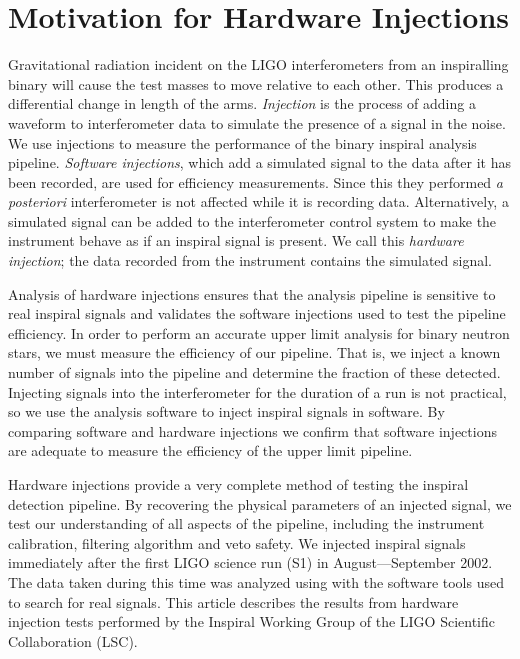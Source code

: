 \section{Motivation for Hardware Injections}
\label{s:intro}
Gravitational radiation incident on the LIGO interferometers from an
inspiralling binary will cause the test masses to move relative to each other.
This produces a differential change in length of the arms\cite{saulson}.
\emph{Injection} is the process of adding a waveform to interferometer data to
simulate the presence of a signal in the noise. We use injections to measure
the performance of the binary inspiral analysis pipeline\cite{abbott2003b}.
\emph{Software injections}, which add a simulated signal to the data after it
has been recorded, are used for efficiency measurements. Since this they
performed \emph{a posteriori} interferometer is not affected while it is
recording data.  Alternatively, a simulated signal can be added to the
interferometer control system to make the instrument behave as if an inspiral
signal is present. We call this \emph{hardware injection}; the data recorded
from the instrument contains the simulated signal.

Analysis of hardware injections ensures that the analysis pipeline is
sensitive to real inspiral signals and validates the software injections used
to test the pipeline efficiency.  In order to perform an accurate upper limit
analysis for binary neutron stars, we must measure the efficiency of our
pipeline\cite{abbott2003b}. That is, we inject a known number of signals into
the pipeline and determine the fraction of these detected.  Injecting signals
into the interferometer for the duration of a run is not practical, so we use
the analysis software to inject inspiral signals in software.  By comparing
software and hardware injections we confirm that software injections are
adequate to measure the efficiency of the upper limit pipeline.

Hardware injections provide a very complete method of testing the inspiral
detection pipeline. By recovering the physical parameters of an injected
signal, we test our understanding of all aspects of the pipeline, including
the instrument calibration, filtering algorithm and veto safety. We injected
inspiral signals immediately after the first LIGO science run (S1) in
August---September 2002. The data taken during this time was analyzed using
with the software tools used to search for real signals.  This article
describes the results from hardware injection tests performed by the Inspiral
Working Group of the LIGO Scientific Collaboration (LSC).

